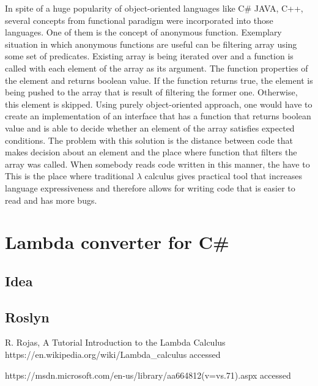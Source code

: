 \documentclass[]{report}
\begin{document}
    In spite of a huge popularity of object-oriented languages like C\# JAVA, C++, several concepts from functional paradigm were incorporated into those languages. One of them is the concept of anonymous function. Exemplary situation in which anonymous functions are useful can be filtering array using some set of predicates. Existing array is being iterated over and a function is called with each element of the array as its argument. The function properties of the element and returns boolean value. If the function returns true, the element is being pushed to the array that is result of filtering the former one. Otherwise, this element is skipped. 
    Using purely object-oriented approach, one would have to create an implementation of an interface that has a function that returns boolean value and is able to decide whether an element of the array satisfies expected conditions. The problem with this solution is the distance between code that makes decision about an element and the place where function that filters the array was called. When somebody reads code written in this manner, the have to 
    This is the place where traditional $\lambda$ calculus gives practical tool that increases language expressiveness and therefore allows for writing code that is easier to read and has more bugs.
    
    \chapter{Lambda converter for C\#}
    \section{Idea}
   \section{Roslyn}
    
    
    
    
    
\begin{thebibliography}{80}
     R. Rojas, A Tutorial Introduction to the Lambda Calculus
     https://en.wikipedia.org/wiki/Lambda\_calculus accessed \date{01.05.2017}
     https://msdn.microsoft.com/en-us/library/aa664812(v=vs.71).aspx
    accessed \date{01.05.2017}
    

\end{thebibliography}
\end{document}
